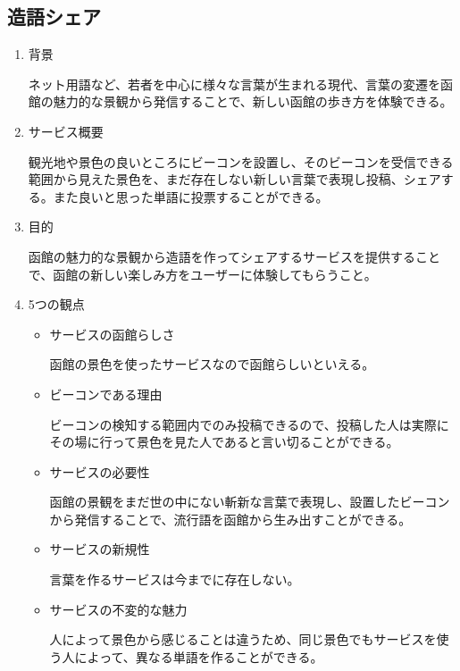 \subsection{造語シェア}
\begin{enumerate}
    \item 背景
    \par ネット用語など、若者を中心に様々な言葉が生まれる現代、言葉の変遷を函館の魅力的な景観から発信することで、新しい函館の歩き方を体験できる。
    \item サービス概要
    \par 観光地や景色の良いところにビーコンを設置し、そのビーコンを受信できる範囲から見えた景色を、まだ存在しない新しい言葉で表現し投稿、シェアする。また良いと思った単語に投票することができる。
    \item 目的
    \par 函館の魅力的な景観から造語を作ってシェアするサービスを提供することで、函館の新しい楽しみ方をユーザーに体験してもらうこと。
    \item 5つの観点
    \begin{itemize}
        \item サービスの函館らしさ
        \par 函館の景色を使ったサービスなので函館らしいといえる。
        \item ビーコンである理由
        \par ビーコンの検知する範囲内でのみ投稿できるので、投稿した人は実際にその場に行って景色を見た人であると言い切ることができる。
        \item サービスの必要性
        \par 函館の景観をまだ世の中にない斬新な言葉で表現し、設置したビーコンから発信することで、流行語を函館から生み出すことができる。
        \item サービスの新規性
        \par 言葉を作るサービスは今までに存在しない。
        \item サービスの不変的な魅力
        \par 人によって景色から感じることは違うため、同じ景色でもサービスを使う人によって、異なる単語を作ることができる。
    \end{itemize}
\end{enumerate}

